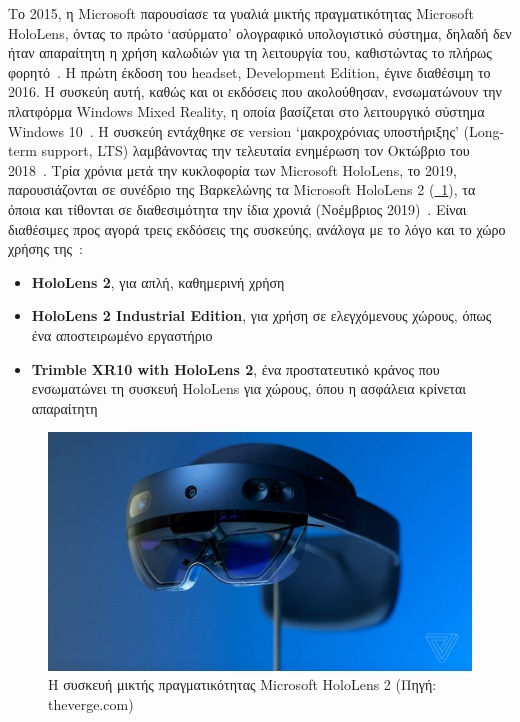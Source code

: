 
Το 2015, η Microsoft παρουσίασε τα γυαλιά μικτής πραγματικότητας Microsoft HoloLens, όντας το πρώτο `ασύρματο' ολογραφικό υπολογιστικό σύστημα, δηλαδή δεν ήταν απαραίτητη η χρήση καλωδιών για τη λειτουργία του, καθιστώντας το πλήρως φορητό~\cite{a2021_hololens}. Η πρώτη έκδοση του headset, Development Edition, έγινε διαθέσιμη το 2016. Η συσκεύη αυτή, καθώς και οι εκδόσεις που ακολούθησαν, ενσωματώνουν την πλατφόρμα Windows Mixed Reality, η οποία βασίζεται στο λειτουργικό σύστημα Windows 10~\cite{kipman_2016_announcing}. Η συσκεύη εντάχθηκε σε version `μακροχρόνιας υποστήριξης' (Long-term support, LTS) λαμβάνοντας την τελευταία ενημέρωση τον Οκτώβριο του 2018~\cite{a2023_hololens}\cite{bowden_2019_the}. Τρία χρόνια μετά την κυκλοφορία των Microsoft HoloLens, το 2019, παρουσιάζονται σε συνέδριο της Βαρκελώνης τα Microsoft HoloLens 2 (\hyperref[fig:hololensDevice]{\schema~\ref*{fig:hololensDevice}}), τα όποια και τίθονται σε διαθεσιμότητα την ίδια χρονιά (Νοέμβριος 2019)~\cite{white_2019_microsoft}. Είναι διαθέσιμες προς αγορά τρεις εκδόσεις της συσκεύης, ανάλογα με το λόγο και το χώρο χρήσης της~\cite{microsoft_2019_hololens}: 
\begin{itemize}
    \item \textbf{HoloLens 2}, για απλή, καθημερινή χρήση
    \item \textbf{HoloLens 2 Industrial Edition}, για χρήση σε ελεγχόμενους χώρους, όπως ένα αποστειρωμένο εργαστήριο
    \item \textbf{Trimble XR10 with HoloLens 2}, ένα προστατευτικό κράνος που ενσωματώνει τη συσκευή HoloLens για χώρους, όπου η ασφάλεια κρίνεται απαραίτητη
\end{itemize}
\begin{figure}[!ht]
    \centering
    \includegraphics[width=130mm]{images/microsoft_hololens_2.jpg}
    \caption{Η συσκευή μικτής πραγματικότητας Microsoft HoloLens 2 {\footnotesize (Πηγή: theverge.com)}}\label{fig:hololensDevice}
\end{figure}

